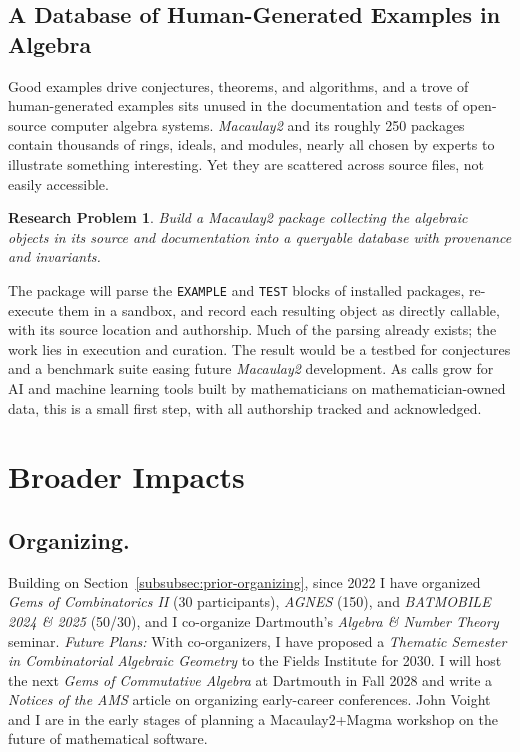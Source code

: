 \documentclass[11pt,reqno]{amsart}
\newtheorem{problem}[lemma]{Research Problem}
\theoremstyle{remark}
\begin{document}
 \subsection{A Database of Human-Generated Examples in Algebra}
Good examples drive conjectures, theorems, and algorithms, and a trove of human-generated examples sits unused in the documentation and tests of open-source computer algebra systems. \textit{Macaulay2} and its roughly 250 packages contain thousands of rings, ideals, and modules, nearly all chosen by experts to illustrate something interesting. Yet they are scattered across source files, not easily accessible.
\begin{problem}\label{prob:database-m2}
	Build a \textit{Macaulay2} package collecting the algebraic objects in its source and documentation into a queryable database with provenance and invariants.
\end{problem}

The package will parse the \texttt{EXAMPLE} and \texttt{TEST} blocks of installed packages, re-execute them in a sandbox, and record each resulting object as directly callable, with its source location and authorship. Much of the parsing already exists; the work lies in execution and curation. The result would be a testbed for conjectures and a benchmark suite easing future \textit{Macaulay2} development. As calls grow for AI and machine learning tools built by mathematicians on mathematician-owned data, this is a small first step, with all authorship tracked and acknowledged.

\section{Broader Impacts}\label{sec:broader-impacts} 
\subsection{Organizing.} Building on Section~\ref{subsubsec:prior-organizing}, since 2022 I have organized \textit{Gems of Combinatorics II} (30 participants), \textit{AGNES} (150), and \textit{BATMOBILE 2024 \& 2025} (50/30), and I co-organize Dartmouth's \textit{Algebra \& Number Theory} seminar. \emph{Future Plans:}  With co-organizers, I have proposed a \textit{Thematic Semester in Combinatorial Algebraic Geometry} to the Fields Institute for 2030. I will host the next \textit{Gems of Commutative Algebra} at Dartmouth in Fall 2028 and write a \textit{Notices of the AMS} article on organizing early-career conferences. John Voight and I are in the early stages of planning a Macaulay2+Magma workshop on the future of mathematical software.
\end{document}
